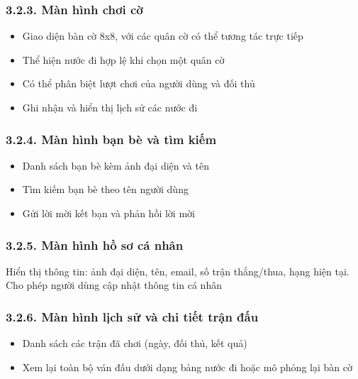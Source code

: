 \documentclass[a4paper,12pt]{article}
\begin{document}
\subsubsection*{3.2.3. Màn hình chơi cờ} %

\noindent \begin{itemize}[label=·]
    \item Giao diện bàn cờ 8x8, với các quân cờ có thể tương tác trực tiếp
    \item Thể hiện nước đi hợp lệ khi chọn một quân cờ
    \item Có thể phân biệt lượt chơi của người dùng và đối thủ 
    \item Ghi nhận và hiển thị lịch sử các nước đi
\end{itemize}

\subsubsection*{3.2.4. Màn hình bạn bè và tìm kiếm} %

\noindent \begin{itemize}[label=·]
    \item Danh sách bạn bè kèm ảnh đại diện và tên
    \item Tìm kiếm bạn bè theo tên người dùng
    \item Gửi lời mời kết bạn và phản hồi lời mời
\end{itemize}

\subsubsection*{3.2.5. Màn hình hồ sơ cá nhân} %


\noindent Hiển thị thông tin: ảnh đại diện, tên, email, số trận thắng/thua, hạng hiện tại.
\noindent Cho phép người dùng cập nhật thông tin cá nhân

\subsubsection*{3.2.6. Màn hình lịch sử và chi tiết trận đấu} %


\noindent \begin{itemize}[label=·]
    \item Danh sách các trận đã chơi (ngày, đối thủ, kết quả)
    \item Xem lại toàn bộ ván đấu dưới dạng bảng nước đi hoặc mô phỏng lại bàn cờ
\end{itemize}
\end{document}
